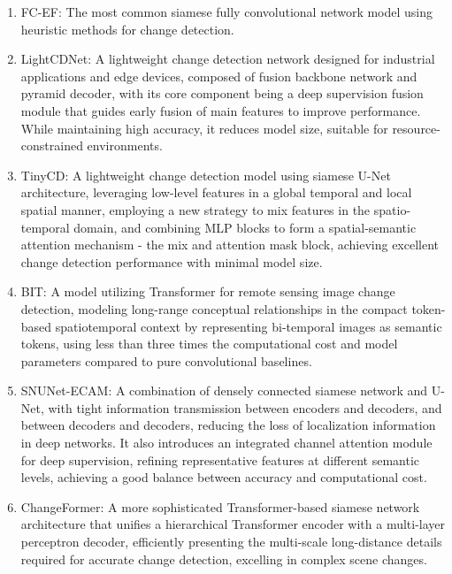 \documentclass[a4paper,fleqn]{cas-dc}
\begin{document}
\begin{enumerate}
    \item FC-EF: The most common siamese fully convolutional network model using heuristic methods for change detection.
    \item LightCDNet: A lightweight change detection network designed for industrial applications and edge devices, composed of fusion backbone network and pyramid decoder, with its core component being a deep supervision fusion module that guides early fusion of main features to improve performance. While maintaining high accuracy, it reduces model size, suitable for resource-constrained environments.
    \item TinyCD: A lightweight change detection model using siamese U-Net architecture, leveraging low-level features in a global temporal and local spatial manner, employing a new strategy to mix features in the spatio-temporal domain, and combining MLP blocks to form a spatial-semantic attention mechanism - the mix and attention mask block, achieving excellent change detection performance with minimal model size.
    \item BIT: A model utilizing Transformer for remote sensing image change detection, modeling long-range conceptual relationships in the compact token-based spatiotemporal context by representing bi-temporal images as semantic tokens, using less than three times the computational cost and model parameters compared to pure convolutional baselines.
    \item SNUNet-ECAM: A combination of densely connected siamese network and U-Net, with tight information transmission between encoders and decoders, and between decoders and decoders, reducing the loss of localization information in deep networks. It also introduces an integrated channel attention module for deep supervision, refining representative features at different semantic levels, achieving a good balance between accuracy and computational cost.
    \item ChangeFormer: A more sophisticated Transformer-based siamese network architecture that unifies a hierarchical Transformer encoder with a multi-layer perceptron decoder, efficiently presenting the multi-scale long-distance details required for accurate change detection, excelling in complex scene changes.
\end{enumerate}
\end{document}
